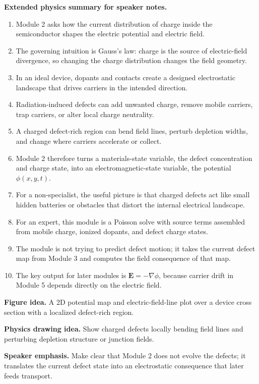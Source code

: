 \documentclass[11pt]{article}
\begin{document}
\textbf{Extended physics summary for speaker notes.}
\begin{enumerate}[leftmargin=1.6em]
    \item Module 2 asks how the current distribution of charge inside the semiconductor shapes the electric potential and electric field.
    \item The governing intuition is Gauss's law: charge is the source of electric-field divergence, so changing the charge distribution changes the field geometry.
    \item In an ideal device, dopants and contacts create a designed electrostatic landscape that drives carriers in the intended direction.
    \item Radiation-induced defects can add unwanted charge, remove mobile carriers, trap carriers, or alter local charge neutrality.
    \item A charged defect-rich region can bend field lines, perturb depletion widths, and change where carriers accelerate or collect.
    \item Module 2 therefore turns a materials-state variable, the defect concentration and charge state, into an electromagnetic-state variable, the potential \(\phi(x,y,t)\).
    \item For a non-specialist, the useful picture is that charged defects act like small hidden batteries or obstacles that distort the internal electrical landscape.
    \item For an expert, this module is a Poisson solve with source terms assembled from mobile charge, ionized dopants, and defect charge states.
    \item The module is not trying to predict defect motion; it takes the current defect map from Module 3 and computes the field consequence of that map.
    \item The key output for later modules is \(\bm{E}=-\nabla\phi\), because carrier drift in Module 5 depends directly on the electric field.
\end{enumerate}

\textbf{Figure idea.} A 2D potential map and electric-field-line plot over a device cross section with a localized defect-rich region.

\textbf{Physics drawing idea.} Show charged defects locally bending field lines and perturbing depletion structure or junction fields.

\textbf{Speaker emphasis.} Make clear that Module 2 does not evolve the defects; it translates the current defect state into an electrostatic consequence that later feeds transport.
\end{document}
